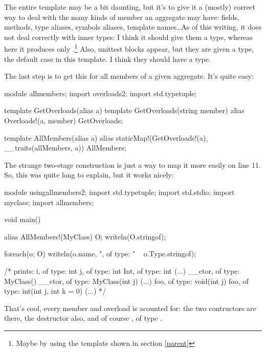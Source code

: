 The entire template may be a bit daunting, but it's to give it a (mostly) correct way to deal with the many kinds of member an aggregate may have: fields, methods, type aliases, symbols aliases, template names\ldots As of this writing, it does not deal correctly with inner types: I think it should give them a  type, whereas here it produces only .\footnote{ Maybe by using the  template shown in section \ref{parent}} Also, unittest blocks appear, but they are given a  type, the default case in this template. I think they should have a \DD{()} type.

The last step is to get this for all members of a given aggregate. It's quite easy:

\begin{ndcode}
module allmembers;
import overloads2;
import std.typetuple;

template GetOverloads(alias a)
{
    template GetOverloads(string member)
    {
        alias Overloads!(a, member) GetOverloads;
    }
}

template AllMembers(alias a)
{
    alias staticMap!(GetOverloads!(a), __traits(allMembers, a)) AllMembers; 
}
\end{ndcode}

The strange  two-stage construction is just a way to map it more easily on line 11. So, this was quite long to explain, but it works nicely:

\begin{dcode}
module usingallmembers2;
import std.typetuple;
import std.stdio;
import myclass;
import allmembers;

void main()
{
    alias AllMembers!(MyClass) O;
    writeln(O.stringof);

    foreach(o; O)
        writeln(o.name, ", of type: " ~ o.Type.stringof);

    /*
    prints:
    i, of type: int
    j, of type: int
    Int, of type: int
    (...)
    __ctor, of type: MyClass()
    __ctor, of type: MyClass(int j)
    (...)
    foo, of type: void(int j)
    foo, of type: int(int j, int k = 0)
    (...)
    */
}
\end{dcode}

That's cool, every member and overload is acounted for: the two contructors are there, the destructor also, and of course , of type .


